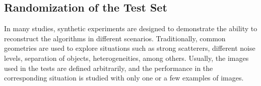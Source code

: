 		\subsection{Randomization of the Test Set}\label{chap:proposed-methodology:library:randomization}
		
			In many studies, synthetic experiments are designed to demonstrate the ability to reconstruct the algorithms in different scenarios. Traditionally, common geometries are used to explore situations such as strong scatterers, different noise levels, separation of objects, heterogeneities, among others. Usually, the images used in the tests are defined arbitrarily, and the performance in the corresponding situation is studied with only one or a few examples of images.
			

